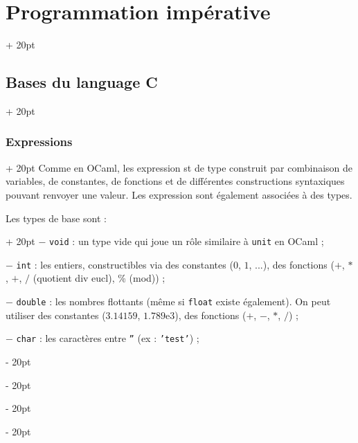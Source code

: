 \documentclass[a4paper, 12pt, twoside]{article}
\newcommand{\ind}[1][20pt]{\advance\leftskip + #1}
\newcommand{\deind}[1][20pt]{\advance\leftskip - #1}
\newenvironment{indentedenv}[1][20pt]{\par \ind[#1]}{\par \deind}
\newenvironment{indt}[2][20pt]{#2 \begin{indentedenv}[#1]}{\end{indentedenv}} %
\begin{document}
    \begin{indt}{\section{Programmation impérative}}
        
        \begin{indt}{\subsection{Bases du language C}}
            
            \begin{indt}{\subsubsection{Expressions}}
                Comme en OCaml, les expression st de type construit par combinaison de variables, de constantes, de fonctions et de différentes constructions syntaxiques pouvant renvoyer une valeur. Les expression sont également associées à des types.
                
                \begin{indt}{Les types de base sont :}
                    $-$ \texttt{void} : un type vide qui joue un rôle similaire à \texttt{unit} en OCaml ;
                    
                    \vspace{6pt}
                    
                    $-$ \texttt{int} : les entiers, constructibles via des constantes ($0$, $1$, ...), des fonctions ($+$, $*$, $+$, $/$ (quotient div eucl), \% (mod)) ;
                    
                    \vspace{6pt}
                    
                    $-$ \texttt{double} : les nombres flottants (même si \texttt{float} existe également). On peut utiliser des constantes ($3.14159$, $1.789\mathrm e3$), des fonctions ($+$, $-$, $*$, $/$) ;
                    
                    \vspace{6pt}
                    
                    $-$ \texttt{char} : les caractères entre \texttt{''} (ex : \texttt{'test'}) ;
                    
                    \vspace{6pt}
                    

\end{indt}
\end{indt}
\end{indt}
\end{indt}
\end{document}
